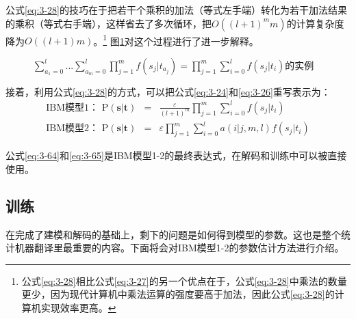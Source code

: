 \noindent  公式\ref{eq:3-28}的技巧在于把若干个乘积的加法（等式左手端）转化为若干加法结果的乘积（等式右手端），这样省去了多次循环，把$O((l+1)^m m)$的计算复杂度降为$O((l+1)m)$。\footnote{公式\ref{eq:3-28}相比公式\ref{eq:3-27}的另一个优点在于，公式\ref{eq:3-28}中乘法的数量更少，因为现代计算机中乘法运算的强度要高于加法，因此公式\ref{eq:3-28}的计算机实现效率更高。} 图\ref{fig:3-21}对这个过程进行了进一步解释。

\begin{figure}[htp]
    \centering

   \caption{$\sum\limits_{a_1=0}^{l} ... \sum\limits_{a_m=0}^{l} \prod\limits_{j=1}^{m} f(s_j|t_{a_j}) = \prod\limits_{j=1}^{m} \sum\limits_{i=0}^{l} f(s_j|t_i)$的实例}
   \label{fig:3-21}
\end{figure}

\parinterval 接着，利用公式\ref{eq:3-28}的方式，可以把公式\ref{eq:3-24}和\ref{eq:3-26}重写表示为：
\begin{eqnarray}
\textrm{IBM模型1：\ \ \ \ } \textrm{P}(\mathbf{s}| \mathbf{t}) & = & \frac{\varepsilon}{(l+1)^{m}} \prod\limits_{j=1}^{m} \sum\limits_{i=0}^{l} f(s_j|t_i) \label{eq:3-64} \\
\textrm{IBM模型2：\ \ \ \ }\textrm{P}(\mathbf{s}| \mathbf{t}) & = & \varepsilon \prod\limits_{j=1}^{m} \sum\limits_{i=0}^{l} a(i|j,m,l) f(s_j|t_i) \label{eq:3-65}
\label{eq:3-29}
\end{eqnarray}

公式\ref{eq:3-64}和\ref{eq:3-65}是IBM模型1-2的最终表达式，在解码和训练中可以被直接使用。


\subsection{训练}

\parinterval 在完成了建模和解码的基础上，剩下的问题是如何得到模型的参数。这也是整个统计机器翻译里最重要的内容。下面将会对IBM模型1-2的参数估计方法进行介绍。



